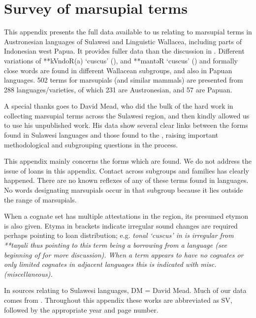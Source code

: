\chapter{Survey of marsupial terms}\label{ch:SurMar}
This appendix presents the full data available to us relating
to marsupial terms in Austronesian languages of Sulawesi
and Linguistic Wallacea, including parts of Indonesian west Papua.
It provides fuller data than the discussion in .
Different variations of **kVndoR(a) ‘cuscus’ (),
and **mantəR ‘cuscus’ ()
and formally close words are found in different Wallacean subgroups,
and also in Papuan languages.
502 terms for marsupials (and similar mammals)
are presented from 288 languages/varieties,
of which 231 are Austronesian,
and 57 are Papuan.

A special thanks goes to David Mead,
who did the bulk of the hard work in collecting marsupial terms
across the Sulawesi region,
and then kindly allowed us to use his unpublished work.
His data show several clear links between the forms found in
Sulawesi languages and those found to the ,
raising important methodological and subgrouping questions in the process.

This appendix mainly concerns the forms which are found.
We do not address the issue of loans in this appendix.
Contact across subgroups and families has clearly happened.
There are no known reflexes of any of these terms
found in  languages.
No words designating marsupials occur in that subgroup because
it lies outside the range of marsupials.

When a cognate set has multiple attestations in the region,
its presumed etymon is also given.
Etyma in brackets indicate irregular sound changes are required
perhaps pointing to loan distribution; e.g.
 \it{tonal} ‘cuscus’ in  is irregular from **taŋali thus
pointing to this term being a borrowing from a 
language (see beginning of  for more discussion).
When a term appears to have no cognates or only limited cognates
in adjacent languages this is indicated with \it{misc.} (miscellaneous).

In sources relating to Sulawesi languages,
DM = David Mead.
Much of our data comes from
\citet{SmitsVoorhoeve1992a,SmitsVoorhoeve1992b,SmitsVoorhoeve1994,SmitsVoorhoeve1998}.
Throughout this appendix these works are abbreviated as SV,
followed by the appropriate year and page number.

